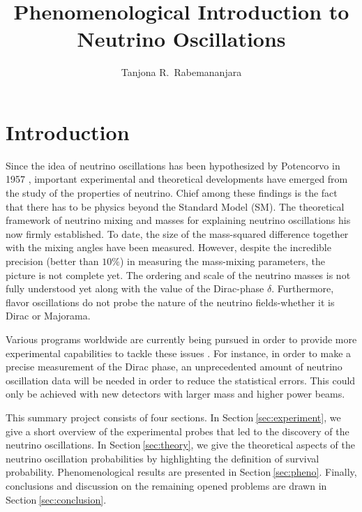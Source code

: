 \documentclass[twocolumn,secnumarabic,amssymb, nobibnotes, aps, prd,10pt]{revtex4-1}
\newcommand{\Sec}[1]{Section$\:$\ref{#1}}
\begin{document}
\title{\texorpdfstring{Phenomenological Introduction to Neutrino Oscillations}{Phenomenological Introduction to Neutrino Oscillations}}

\author{Tanjona R.\ Rabemananjara}

\maketitle

\section{Introduction}

Since the idea of neutrino oscillations has been hypothesized by Potencorvo in 1957
\cite{Potencorvo:1957cp, Pontecorvo:1957qd}, important experimental and theoretical
developments have emerged from the study of the properties of neutrino. Chief among
these findings is the fact that there has to be physics beyond the Standard Model 
(SM). The theoretical framework of neutrino mixing and masses for explaining neutrino
oscillations his now firmly established. To date, the size of the mass-squared 
difference together with the mixing angles have been measured. However, despite the
incredible precision (better than $10 \%$) in measuring the mass-mixing parameters, 
the picture is not complete yet. The ordering and scale of the neutrino masses is not
fully understood yet along with the value of the Dirac-phase $\delta$. Furthermore, 
flavor oscillations do not probe the nature of the neutrino fields-whether it is Dirac 
or Majorama.

Various programs worldwide are currently being pursued in order to provide more
experimental capabilities to tackle these issues \cite{Acciarri:2015uup, Antonello:2015lea, 
An:2015jdp, Djurcic:2015vqa, Adamson:2016tbq, Kim:2014rfa,  Adamson:2016xxw, Abe:2015awa,
Adams:2013qkq}. For instance, in order to make a precise measurement of the Dirac phase, an 
unprecedented amount of neutrino oscillation data will be needed in order to reduce the 
statistical errors. This could only be achieved with new detectors with larger mass and 
higher power beams.

This summary project consists of four sections. In \Sec{sec:experiment}, we give a short
overview of the experimental probes that led to the discovery of the neutrino oscillations.
In \Sec{sec:theory}, we give the theoretical aspects of the neutrino oscillation probabilities
by highlighting the definition of survival probability. Phenomenological results are presented
in \Sec{sec:pheno}. Finally, conclusions and discussion on the remaining opened problems are
drawn in \Sec{sec:conclusion}.
\end{document}
